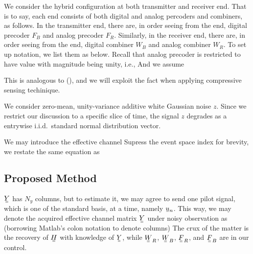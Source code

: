 We consider the hybrid configuration at both transmitter and receiver end.
That is to say, each end consists of both digital and analog percoders and combiners, as follows.
In the transmitter end, there are, in order seeing from the end, digital precoder \(F_B\) and analog precoder \(F_R\).
Similarly, in the receiver end, there are, in order seeing from the end, digital combiner \(W_B\) and analog combiner \(W_R\).
To set up notation, we list them as below.
%
%
Recall that analog precoder is restricted to have value with magnitude being unity, i.e.,
%
%
And we assume

This is analogous to (), and we will exploit the fact when applying compressive sensing techinique.

We consider zero-mean, unity-variance additive white Gaussian noise \(z\).
Since we restrict our discussion to a specific slice of time, the signal \(z\) degrades as a entrywise i.i.d.\ standard normal distribution vector.

We may introduce the effective channel
%
%
Supress the event space index for brevity, we restate the same equation as
%

\subsection{Proposed Method}

\(\M{Y}\) has \(N_y\) columns, but to estimate it, we may agree to send one pilot signal, which is one of the standard basis, at a time, namely \(\V{u}_n\).
This way, we may denote the acquired effective channel matrix \(\M{Y}\) under noisy observation as (borrowing Matlab's colon notation to denote columns)
%
%
The crux of the matter is the recovery of \(\M{H}\) with knowledge of \(\M{Y}\), while \(\M{W}_R\), \(\M{W}_B\), \(\M{F}_R\), and \(\M{F}_B\) are in our control.

